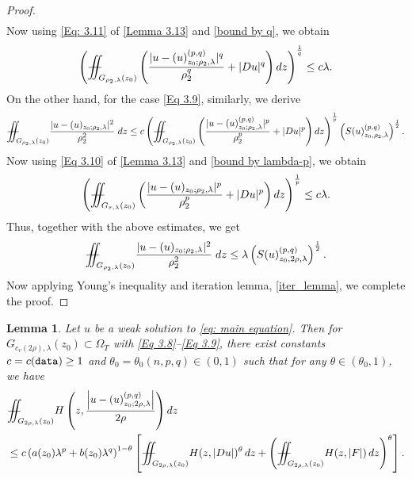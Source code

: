 \documentclass[11pt,oneside, english,reqno,twoside a4paper]{amsart}
\newtheorem{lemma}{Lemma}[section]
\theoremstyle{definition}
\numberwithin{theorem}{section}
\numberwithin{equation}{section}
\newcommand{\iintss}{{\int\hspace{-0.28cm}\int}}
\newcommand{ \miints }{{\iintss\hspace{-0.56cm} -\hspace{-0.15cm}-}}
\newcommand{\miint}[1]{{\miints_{\hspace{-0.13cm}#1}}}
\begin{document}
\begin{proof}
\begin{align*}
\end{align*}
Now using \eqref{Eq: 3.11} of \cref{Lemma 3.13} and \eqref{bound by q}, we obtain
\begin{align*}
\left(\miint{G_{\rho_2, \lambda}(z_0)}\left(\frac{|u-(u)^{(p,q)}_{z_0;\rho_2,\lambda}|^q}{\rho_2^q}+|Du|^q\right)dz\right)^{\frac{1}{q}} \leq c \lambda.    
\end{align*}
On the other hand, for the case \eqref{Eq 3.9}, similarly,  we derive
\begin{align*}
   \miint{G_{\rho_2,\lambda}(z_0)}\frac{|u-(u)_{z_0;\rho_2,\lambda}|^2}{\rho_2^2}\; dz \leq c\left(\miint{G_{\rho_2, \lambda}(z_0)}\left(\frac{|u-(u)^{(p,q)}_{z_0;\rho_2,\lambda}|^p}{\rho_2^p}+|Du|^p\right)dz\right)^{\frac{1}{p}}\left(S(u)^{(p,q)}_{z_0, \rho_2, \lambda}\right)^{\frac{1}{2}}.
\end{align*}
Now using \eqref{Eq 3.10} of \cref{Lemma 3.13} and \eqref{bound by lambda-p}, we obtain
\begin{align*}
    \left(\miint{G_{\tau, \lambda}(z_0)}\left(\frac{|u-(u)_{z_0;\rho_2,\lambda}|^p}{\rho_2^p}+|Du|^p\right)dz\right)^{\frac{1}{p}} \leq c \lambda.
\end{align*}
Thus, together with the above estimates, we get
    \begin{align*}
     \miint{G_{\rho_2,\lambda}(z_0)}\frac{|u-(u)_{z_0;\rho_2,\lambda}|^2}{\rho_2^2}\; dz \leq \lambda \left(S(u)^{(p,q)}_{z_0, 2\rho, \lambda}\right)^{\frac{1}{2}}.
    \end{align*}
    Now applying Young's inequality and iteration lemma, \cref{iter_lemma}, we complete the proof.
\end{proof}
\begin{lemma}\label{Lemma 3.15}
Let $u$ be a weak solution to \eqref{eq: main equation}. Then for $G_{c_v(2 \rho),\lambda}\left(z_0\right) \subset \Omega_T$ with \eqref{Eq 3.8}--\eqref{Eq 3.9}, there exist constants $c=c(\textnormal{\texttt{data}}) \geq 1$ and $\theta_0=\theta_0(n, p, q) \in(0,1)$ such that for any $\theta \in\left(\theta_0, 1\right)$, we have
\begin{align}\label{EQQ3.15}
&\miint{G_{2 \rho,\lambda}\left(z_0\right)} H\left(z,\frac{\left|u-(u)^{(p, q)}_{z_0 ; 2 \rho,\lambda}\right|}{2 \rho}\right) d z \nonumber\\
&\leq c\left(a(z_0)\lambda^p+b(z_0)\lambda^q\right)^{1-\theta}\left[\miint{G_{2 \rho,\lambda}\left(z_0\right)} H(z, |Du|)^{\theta}\, dz+\left(\miint{G_{2\rho, \lambda}(z_0)}H(z, |F|)\, dz\right)^{\theta}\right]. 
\end{align}
\end{lemma}
\end{document}
